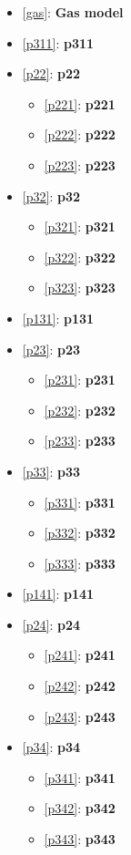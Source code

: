 \begin{itemize}
        \item \ref{gas}: {\bf Gas model}
        \item \ref{p311}: {\bf  p311}
        \item \ref{p22}: {\bf  p22}
        \begin{itemize}
                \item \ref{p221}: {\bf  p221}
                \item \ref{p222}: {\bf  p222}
                \item \ref{p223}: {\bf  p223}
        \end{itemize}
        \item \ref{p32}: {\bf  p32}
        \begin{itemize}
                \item \ref{p321}: {\bf  p321}
                \item \ref{p322}: {\bf  p322}
                \item \ref{p323}: {\bf  p323}
        \end{itemize}
        \item \ref{p131}: {\bf  p131}
        \item \ref{p23}: {\bf  p23}
        \begin{itemize}
                \item \ref{p231}: {\bf  p231}
                \item \ref{p232}: {\bf  p232}
                \item \ref{p233}: {\bf p233}
        \end{itemize}
        \item \ref{p33}: {\bf  p33}
        \begin{itemize}
                \item \ref{p331}: {\bf  p331}
                \item \ref{p332}: {\bf  p332}
                \item \ref{p333}: {\bf  p333}
        \end{itemize}
        \item \ref{p141}: {\bf  p141}
        \item \ref{p24}: {\bf  p24}
        \begin{itemize}
                \item \ref{p241}: {\bf  p241}
                \item \ref{p242}: {\bf  p242}
                \item \ref{p243}: {\bf  p243}
        \end{itemize}
        \item \ref{p34}: {\bf  p34}
        \begin{itemize}
                \item \ref{p341}: {\bf  p341}
                \item \ref{p342}: {\bf  p342}
                \item \ref{p343}: {\bf  p343}
        \end{itemize}
\end{itemize}


